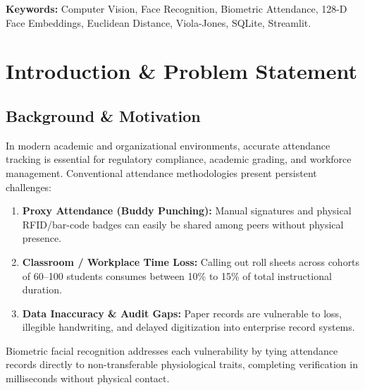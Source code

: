 \documentclass[12pt,a4paper]{article}
\begin{document}
\vspace{0.4cm}
\noindent\textbf{Keywords:} Computer Vision, Face Recognition, Biometric Attendance, 128-D Face Embeddings, Euclidean Distance, Viola-Jones, SQLite, Streamlit.

\newpage

\section{Introduction \& Problem Statement}
\label{sec:intro}

\subsection{Background \& Motivation}
In modern academic and organizational environments, accurate attendance tracking is essential for regulatory compliance, academic grading, and workforce management. Conventional attendance methodologies present persistent challenges:
\begin{enumerate}
    \item \textbf{Proxy Attendance (Buddy Punching):} Manual signatures and physical RFID/bar-code badges can easily be shared among peers without physical presence.
    \item \textbf{Classroom / Workplace Time Loss:} Calling out roll sheets across cohorts of 60--100 students consumes between 10\% to 15\% of total instructional duration.
    \item \textbf{Data Inaccuracy \& Audit Gaps:} Paper records are vulnerable to loss, illegible handwriting, and delayed digitization into enterprise record systems.
\end{enumerate}

Biometric facial recognition addresses each vulnerability by tying attendance records directly to non-transferable physiological traits, completing verification in milliseconds without physical contact.
\end{document}
